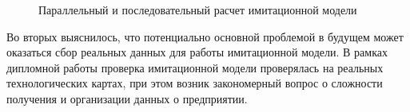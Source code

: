 \begin{figure}[H]
    \caption{Параллельный и последовательный расчет имитационной модели}
    \label{ris:Parallellllee}
\end{figure}

Во вторых выяснилось, что потенциально основной проблемой в будущем может оказаться сбор реальных данных для работы имитационной модели.
В рамках дипломной работы проверка имитационной модели проверялась на реальных технологических картах, при этом возник закономерный вопрос о сложности получения и организации данных о предприятии. 

